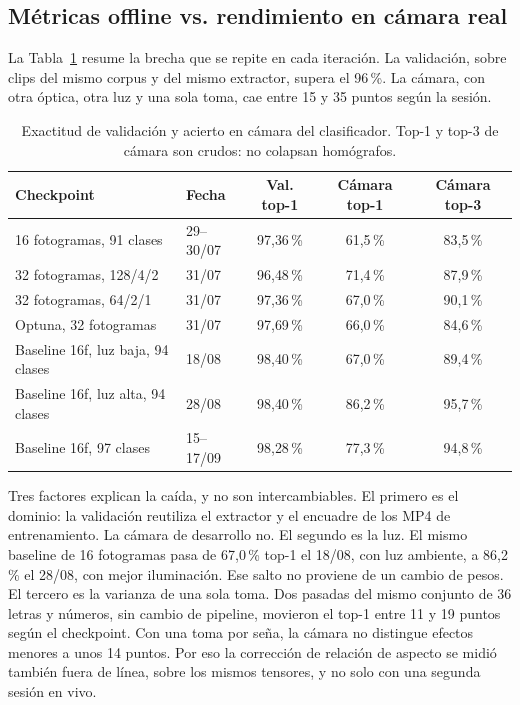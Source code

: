 \subsection{Métricas offline vs. rendimiento en cámara real}

La Tabla~\ref{tab:brecha_offline_camara} resume la brecha que se repite en cada iteración. La validación, sobre clips del mismo corpus y del mismo extractor, supera el 96\,\%. La cámara, con otra óptica, otra luz y una sola toma, cae entre 15 y 35 puntos según la sesión.

\begin{table}[H]
    \centering
    \small
    \caption{Exactitud de validación y acierto en cámara del clasificador. Top-1 y top-3 de cámara son crudos: no colapsan homógrafos.}
    \label{tab:brecha_offline_camara}
    \begin{tabular}{llccc}
        \toprule
        \textbf{Checkpoint} & \textbf{Fecha} & \textbf{Val. top-1} & \textbf{Cámara top-1} & \textbf{Cámara top-3} \\
        \midrule
        16 fotogramas, 91 clases & 29--30/07 & 97{,}36\,\% & 61{,}5\,\% & 83{,}5\,\% \\
        32 fotogramas, 128/4/2 & 31/07 & 96{,}48\,\% & 71{,}4\,\% & 87{,}9\,\% \\
        32 fotogramas, 64/2/1 & 31/07 & 97{,}36\,\% & 67{,}0\,\% & 90{,}1\,\% \\
        Optuna, 32 fotogramas & 31/07 & 97{,}69\,\% & 66{,}0\,\% & 84{,}6\,\% \\
        Baseline 16f, luz baja, 94 clases & 18/08 & 98{,}40\,\% & 67{,}0\,\% & 89{,}4\,\% \\
        Baseline 16f, luz alta, 94 clases & 28/08 & 98{,}40\,\% & 86{,}2\,\% & 95{,}7\,\% \\
        Baseline 16f, 97 clases & 15--17/09 & 98{,}28\,\% & 77{,}3\,\% & 94{,}8\,\% \\
        \bottomrule
    \end{tabular}
\end{table}

Tres factores explican la caída, y no son intercambiables. El primero es el dominio: la validación reutiliza el extractor y el encuadre de los MP4 de entrenamiento. La cámara de desarrollo no. El segundo es la luz. El mismo baseline de 16 fotogramas pasa de 67{,}0\,\% top-1 el 18/08, con luz ambiente, a 86{,}2\,\% el 28/08, con mejor iluminación. Ese salto no proviene de un cambio de pesos. El tercero es la varianza de una sola toma. Dos pasadas del mismo conjunto de 36 letras y números, sin cambio de pipeline, movieron el top-1 entre 11 y 19 puntos según el checkpoint. Con una toma por seña, la cámara no distingue efectos menores a unos 14 puntos. Por eso la corrección de relación de aspecto se midió también fuera de línea, sobre los mismos tensores, y no solo con una segunda sesión en vivo.

